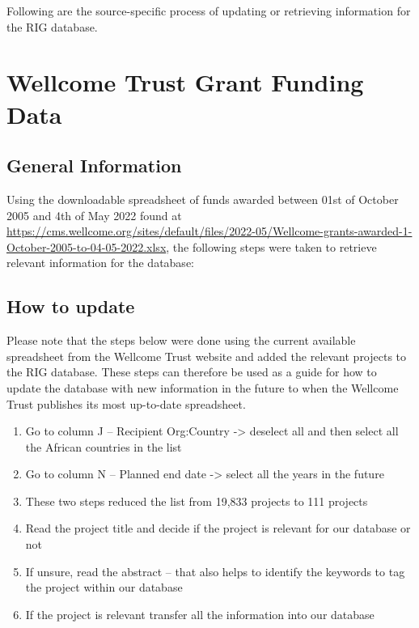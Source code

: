 \documentclass[
]{book}
\begin{document}
Following are the source-specific process of updating or retrieving information for the RIG database.

\hypertarget{update-wellcome}{%
\section{Wellcome Trust Grant Funding Data}\label{update-wellcome}}

\hypertarget{general-information}{%
\subsection{General Information}\label{general-information}}

Using the downloadable spreadsheet of funds awarded between 01st of October 2005 and 4th of May 2022 found at \url{https://cms.wellcome.org/sites/default/files/2022-05/Wellcome-grants-awarded-1-October-2005-to-04-05-2022.xlsx}, the following steps were taken to retrieve relevant information for the database:

\hypertarget{how-to-update}{%
\subsection{How to update}\label{how-to-update}}

Please note that the steps below were done using the current available spreadsheet from the Wellcome Trust website and added the relevant projects to the RIG database. These steps can therefore be used as a guide for how to update the database with new information in the future to when the Wellcome Trust publishes its most up-to-date spreadsheet.

\begin{enumerate}
\def\labelenumi{\arabic{enumi}.}
\item
  Go to column J -- Recipient Org:Country -\textgreater{} deselect all and then select all the African countries in the list
\item
  Go to column N -- Planned end date -\textgreater{} select all the years in the future
\item
  These two steps reduced the list from 19,833 projects to 111 projects
\item
  Read the project title and decide if the project is relevant for our database or not
\item
  If unsure, read the abstract -- that also helps to identify the keywords to tag the project within our database
\item
  If the project is relevant transfer all the information into our database
\end{enumerate}
\end{document}
